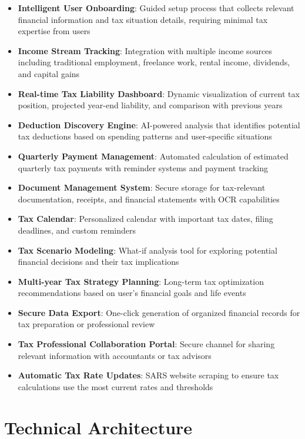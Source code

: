 \documentclass[
  11pt,
  letterpaper,
]{article}
\providecommand{\tightlist}{%
  \setlength{\itemsep}{0pt}\setlength{\parskip}{0pt}}\usepackage{longtable,booktabs,array}
\begin{document}
\begin{itemize}
\tightlist
\item
  \textbf{Intelligent User Onboarding}: Guided setup process that
  collects relevant financial information and tax situation details,
  requiring minimal tax expertise from users
\item
  \textbf{Income Stream Tracking}: Integration with multiple income
  sources including traditional employment, freelance work, rental
  income, dividends, and capital gains
\item
  \textbf{Real-time Tax Liability Dashboard}: Dynamic visualization of
  current tax position, projected year-end liability, and comparison
  with previous years
\item
  \textbf{Deduction Discovery Engine}: AI-powered analysis that
  identifies potential tax deductions based on spending patterns and
  user-specific situations
\item
  \textbf{Quarterly Payment Management}: Automated calculation of
  estimated quarterly tax payments with reminder systems and payment
  tracking
\item
  \textbf{Document Management System}: Secure storage for tax-relevant
  documentation, receipts, and financial statements with OCR
  capabilities
\item
  \textbf{Tax Calendar}: Personalized calendar with important tax dates,
  filing deadlines, and custom reminders
\item
  \textbf{Tax Scenario Modeling}: What-if analysis tool for exploring
  potential financial decisions and their tax implications
\item
  \textbf{Multi-year Tax Strategy Planning}: Long-term tax optimization
  recommendations based on user's financial goals and life events
\item
  \textbf{Secure Data Export}: One-click generation of organized
  financial records for tax preparation or professional review
\item
  \textbf{Tax Professional Collaboration Portal}: Secure channel for
  sharing relevant information with accountants or tax advisors
\item
  \textbf{Automatic Tax Rate Updates}: SARS website scraping to ensure
  tax calculations use the most current rates and thresholds
\end{itemize}

\hypertarget{technical-architecture}{%
\section{Technical Architecture}\label{technical-architecture}}
\end{document}
